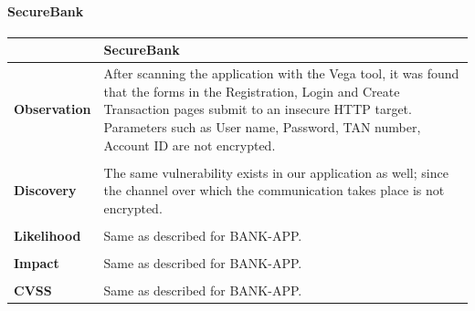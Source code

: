 \paragraph{SecureBank} \mbox{}
\begin{longtable*}{p{.20\textwidth} | p{.80\textwidth}}
    \hline
    & \textbf{SecureBank} \\
    \hline
    \textbf{Observation} &
       After scanning the application with the Vega tool, it was found that the forms in the Registration, Login and Create Transaction pages submit to an insecure HTTP target. Parameters such as User name, Password, TAN number, Account ID are not encrypted.
    \\\\
    \textbf{Discovery} &
    The same vulnerability exists in our application as well; since the channel over which the communication takes place is not encrypted.
    \\\\
    \textbf{Likelihood} &
        Same as described for BANK-APP.
    \\\\
    \textbf{Impact} &
        Same as described for BANK-APP.
    \\\\
    \textbf{CVSS} &
        Same as described for BANK-APP.
    \\
    \hline
\end{longtable*}
\clearpage